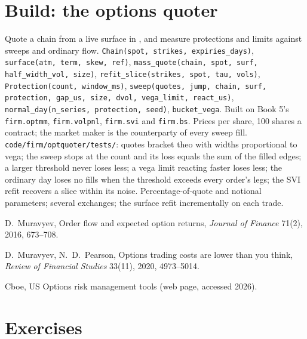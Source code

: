 \section{Build: the options quoter}\label{bld:hf:automated-options-market-making:optquoter}

\begin{build}
 Quote a chain from a live surface in , and measure protections and limits against sweeps and ordinary flow.
 \texttt{Chain(spot, strikes, expiries\_days)}, \texttt{surface(atm, term, skew, ref)}, \texttt{mass\_quote(chain, spot, surf,
half\_width\_vol, size)}, \texttt{refit\_slice(strikes, spot, tau, vols)}, \texttt{Protection(count, window\_ms)}, \texttt{sweep(quotes, jump,
chain, surf, protection, gap\_us, size, dvol, vega\_limit, react\_us)}, \texttt{normal\_day(n\_series, protection, seed)}, \texttt{bucket\_vega}.
Built on Book 5's \texttt{firm.optmm}, \texttt{firm.volpnl}, \texttt{firm.svi} and \texttt{firm.bs}.
 Prices per share, 100 shares a contract; the market maker is the counterparty of every sweep fill.
 \texttt{code/firm/optquoter/tests/}: quotes bracket theo with widths proportional to vega; the sweep stops at the count and
its loss equals the sum of the filled edges; a larger threshold never loses less; a vega limit reacting faster loses less; the ordinary day loses no
fills when the threshold exceeds every order's legs; the SVI refit recovers a slice within its noise.
 Percentage-of-quote and notional parameters; several exchanges; the surface refit incrementally on each trade.
\end{build}

\begin{omsources}
\item D.~Muravyev, Order flow and expected option returns, \emph{Journal of Finance} 71(2), 2016, 673--708.
\item D.~Muravyev, N.~D.~Pearson, Options trading costs are lower than you think, \emph{Review of Financial Studies} 33(11), 2020, 4973--5014.
\item Cboe, US Options risk management tools (web page, accessed 2026).
\end{omsources}

\section{Exercises}

